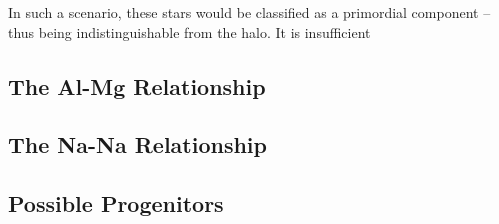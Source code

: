 \documentclass{emulateapj}
\begin{document}




In such a scenario, these stars would be classified as a primordial component -- thus being indistinguishable from the halo. It is insufficient 


\subsection{The Al-Mg Relationship}

\subsection{The Na-Na Relationship}

\subsection{Possible Progenitors}







\end{document}
